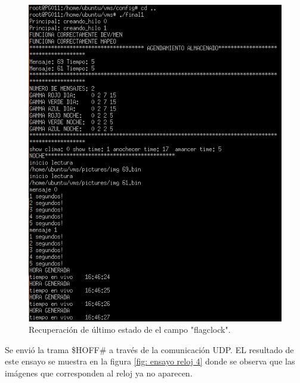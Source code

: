 \begin{figure}[htpb]
	\centering
	\includegraphics[scale=0.8]{Figures/pruebareloj3.png} 
	\caption{Recuperación de último estado de el campo "flagclock".}
	\label{fig: ensayo reloj 3}
\end{figure}

Se envió la trama \$HOFF\# a través de la comunicación UDP.  EL resultado de este ensayo se muestra en la figura \ref{fig: ensayo reloj 4} donde se observa que las imágenes que corresponden al reloj ya no aparecen.

